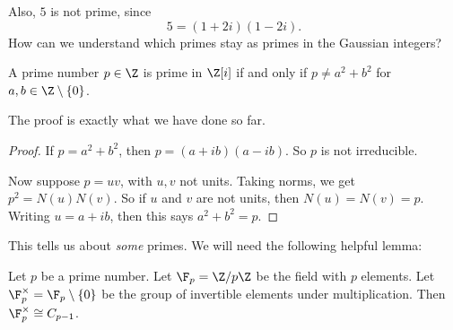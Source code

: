 \documentclass[a4paper]{article}
\begin{document}
Also, $5$ is not prime, since
\[
  5 = (1 + 2i)(1 - 2i).
\]
How can we understand which primes stay as primes in the Gaussian integers?
\begin{prop}
  A prime number $p \in \Z$ is prime in $\Z[i]$ if and only if $p \not= a^2 + b^2$ for $a, b \in \Z \setminus \{0\}$.
\end{prop}
The proof is exactly what we have done so far.

\begin{proof}
  If $p = a^2 + b^2$, then $p = (a + ib)(a - ib)$. So $p$ is not irreducible.

  Now suppose $p = uv$, with $u, v$ not units. Taking norms, we get $p^2 = N(u) N(v)$. So if $u$ and $v$ are not units, then $N(u) = N(v) = p$. Writing $u = a + ib$, then this says $a^2 + b^2 = p$.
\end{proof}

This tells us about \emph{some} primes. We will need the following helpful lemma:

\begin{lemma}
  Let $p$ be a prime number. Let $\F_p = \Z/p\Z$ be the field with $p$ elements. Let $\F_p^\times = \F_p\setminus \{0\}$ be the group of invertible elements under multiplication. Then $\F_p^\times \cong C_{p - 1}$.
\end{lemma}
\end{document}

